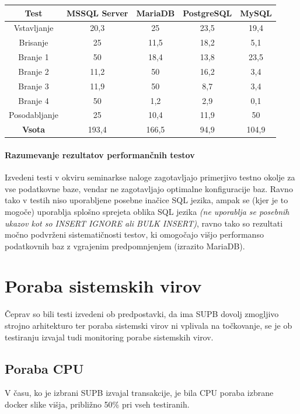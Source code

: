 \documentclass[a4paper,11pt]{report}
\begin{document}
\begin{center}
   \begin{tabular}{||c|c|c|c|c||}
      \hline
      \textbf{Test} & \textbf{MSSQL Server} & \textbf{MariaDB} & \textbf{PostgreSQL} & \textbf{MySQL}\\
      \hline
      \hline
      Vstavljanje & 20,3 & 25 & 23,5 & 19,4\\
      Brisanje & 25 & 11,5 & 18,2 & 5,1\\
      Branje 1 & 50 & 18,4 & 13,8 & 23,5\\
      Branje 2 & 11,2 & 50 & 16,2 & 3,4\\
      Branje 3 & 11,9 & 50 & 8,7 & 3,4\\
      Branje 4 & 50 & 1,2 & 2,9 & 0,1\\
      Posodabljanje & 25 & 10,4 & 11,9 & 50\\
      \hline
      \hline
      \textbf{Vsota} & 193,4 & 166,5 & 94,9 & 104,9\\
      \hline
   \end{tabular}
\end{center}

\paragraph{Razumevanje rezultatov performančnih testov}
Izvedeni testi v okviru seminarkse naloge zagotavljajo primerjivo testno okolje za vse podatkovne baze,
vendar ne zagotavljajo optimalne konfiguracije baz. Ravno tako v testih niso uporabljene posebne inačice SQL jezika,
ampak se (kjer je to mogoče) uporablja splošno sprejeta oblika SQL jezika \textit{(ne uporablja se posebnih ukazov kot so INSERT IGNORE ali BULK INSERT)},
ravno tako so rezultati močno podvrženi sistematičnosti testov, ki omogočajo višjo performanso podatkovnih baz z vgrajenim predpomnjenjem (izrazito MariaDB).

\pagebreak

\section{Poraba sistemskih virov}
Čeprav so bili testi izvedeni ob predpostavki, da ima SUPB dovolj zmogljivo strojno arhitekturo ter poraba sistemski virov ni vplivala na točkovanje, se je ob testiranju izvajal tudi monitoring porabe sistemskih virov.

\subsection{Poraba CPU}
V času, ko je izbrani SUPB izvajal transakcije, je bila CPU poraba izbrane docker slike višja, približno 50\% pri vseh testiranih.
\end{document}
